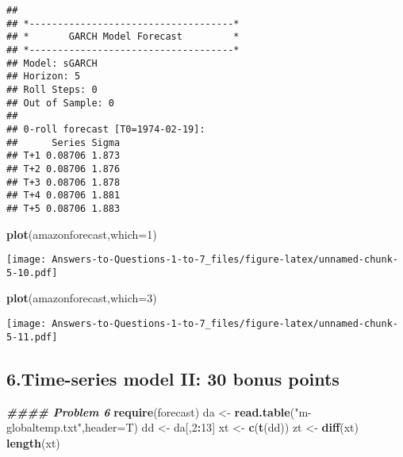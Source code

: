 \documentclass[
]{article}
\newenvironment{Shaded}{\begin{snugshade}}{\end{snugshade}}
\newcommand{\AttributeTok}[1]{\textcolor[rgb]{0.13,0.29,0.53}{#1}}
\newcommand{\DecValTok}[1]{\textcolor[rgb]{0.00,0.00,0.81}{#1}}
\newcommand{\DocumentationTok}[1]{\textcolor[rgb]{0.56,0.35,0.01}{\textbf{\textit{#1}}}}
\newcommand{\FunctionTok}[1]{\textcolor[rgb]{0.13,0.29,0.53}{\textbf{#1}}}
\newcommand{\NormalTok}[1]{#1}
\newcommand{\OtherTok}[1]{\textcolor[rgb]{0.56,0.35,0.01}{#1}}
\newcommand{\SpecialCharTok}[1]{\textcolor[rgb]{0.81,0.36,0.00}{\textbf{#1}}}
\newcommand{\StringTok}[1]{\textcolor[rgb]{0.31,0.60,0.02}{#1}}
\begin{document}
\begin{verbatim}
## 
## *------------------------------------*
## *       GARCH Model Forecast         *
## *------------------------------------*
## Model: sGARCH
## Horizon: 5
## Roll Steps: 0
## Out of Sample: 0
## 
## 0-roll forecast [T0=1974-02-19]:
##      Series Sigma
## T+1 0.08706 1.873
## T+2 0.08706 1.876
## T+3 0.08706 1.878
## T+4 0.08706 1.881
## T+5 0.08706 1.883
\end{verbatim}

\begin{Shaded}
\begin{Highlighting}[]
\FunctionTok{plot}\NormalTok{(amazonforecast,}\AttributeTok{which=}\DecValTok{1}\NormalTok{)}
\end{Highlighting}
\end{Shaded}

\texttt{[image: Answers-to-Questions-1-to-7\_files/figure-latex/unnamed-chunk-5-10.pdf]}

\begin{Shaded}
\begin{Highlighting}[]
\FunctionTok{plot}\NormalTok{(amazonforecast,}\AttributeTok{which=}\DecValTok{3}\NormalTok{)}
\end{Highlighting}
\end{Shaded}

\texttt{[image: Answers-to-Questions-1-to-7\_files/figure-latex/unnamed-chunk-5-11.pdf]}

\subsection{6.Time-series model II: 30 bonus
points}\label{time-series-model-ii-30-bonus-points}

\begin{Shaded}
\begin{Highlighting}[]
\DocumentationTok{\#\#\#\# Problem 6}
\FunctionTok{require}\NormalTok{(forecast)}
\NormalTok{da }\OtherTok{\textless{}{-}} \FunctionTok{read.table}\NormalTok{(}\StringTok{"m{-}globaltemp.txt"}\NormalTok{,}\AttributeTok{header=}\NormalTok{T)}
\NormalTok{dd }\OtherTok{\textless{}{-}}\NormalTok{ da[,}\DecValTok{2}\SpecialCharTok{:}\DecValTok{13}\NormalTok{]}
\NormalTok{xt }\OtherTok{\textless{}{-}} \FunctionTok{c}\NormalTok{(}\FunctionTok{t}\NormalTok{(dd))}
\NormalTok{zt }\OtherTok{\textless{}{-}} \FunctionTok{diff}\NormalTok{(xt)}
\FunctionTok{length}\NormalTok{(xt)}
\end{Highlighting}
\end{Shaded}
\end{document}
